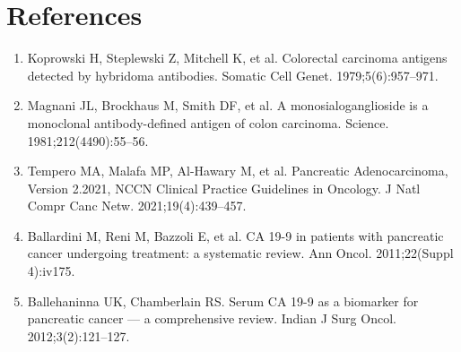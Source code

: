 \section*{References}
\begin{enumerate}
  \item Koprowski H, Steplewski Z, Mitchell K, et al. Colorectal carcinoma antigens detected by hybridoma antibodies. Somatic Cell Genet. 1979;5(6):957--971.
  \item Magnani JL, Brockhaus M, Smith DF, et al. A monosialoganglioside is a monoclonal antibody-defined antigen of colon carcinoma. Science. 1981;212(4490):55--56.
  \item Tempero MA, Malafa MP, Al-Hawary M, et al. Pancreatic Adenocarcinoma, Version 2.2021, NCCN Clinical Practice Guidelines in Oncology. J Natl Compr Canc Netw. 2021;19(4):439--457.
  \item Ballardini M, Reni M, Bazzoli E, et al. CA 19-9 in patients with pancreatic cancer undergoing treatment: a systematic review. Ann Oncol. 2011;22(Suppl 4):iv175.
  \item Ballehaninna UK, Chamberlain RS. Serum CA 19-9 as a biomarker for pancreatic cancer --- a comprehensive review. Indian J Surg Oncol. 2012;3(2):121--127.
\end{enumerate}

\clearpage
